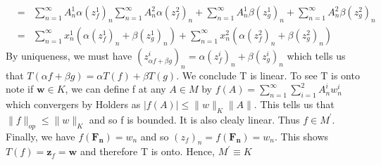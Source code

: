 \documentclass[11pt]{SelfArxOneColBMN}
\begin{document}
\begin{exercise}
\begin{itemize}
\begin{solution}
\begin{eqnarray*}
            &=& \sum_{n=1}^\infty A_n^1\alpha(z_f^1)_n \sum_{n=1}^\infty A_n^2\alpha(z_f^2)_n + \sum_{n=1}^\infty A_n^1\beta(z_g^1)_n + \sum_{n=1}^\infty A_n^2\beta(z_g^2)_n\\
            &=& \sum_{n=1}^\infty x_n^1(\alpha (z_f^1)_n + \beta(z_g^1)_n) + \sum_{n=1}^\infty x_n^2(\alpha (z_f^2)_n + \beta(z_g^2)_n)
        \end{eqnarray*}
        By uniqueness, we must have $(z^i_{\alpha f + \beta g})_n = \alpha (z^i_f)_n + \beta(z^i_g)_n$ which tells us that $T(\alpha f + \beta g) = \alpha T(f) + \beta T(g)$. We conclude T is linear. To see T is onto note if $\mathbf{w} \in K$, we can define f at any $A \in M$ by $f(A) = \sum_{n=1}^\infty \sum_{i=1}^2 A_n^i w_n^i$ which convergers by Holders as $|f(A)| \leq \|w\|_K \|A\|$. This tells us that $\|f\|_{op} \leq \|w\|_K$ and so f is bounded. It is also clealy linear. Thus $f \in M^\prime$. Finally, we have $f(\mathbf{F_n}) = w_n$ and so $(z_f)_n = f(\mathbf{F_n}) = w_n$. This shows $T(f) = \mathbf{z}_f = \mathbf{w}$ and therefore T is onto. Hence, $M^\prime \equiv K$
        \end{solution}
    \end{itemize}
\end{exercise}
\end{document}
